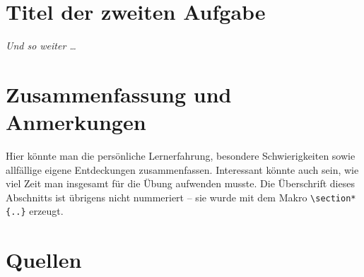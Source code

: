 \documentclass[language=german,titlepage=false,smartquotes=true]{hgbreport}
\begin{document}

\section{Titel der zweiten Aufgabe}

\emph{Und so weiter \ldots}


\section*{Zusammenfassung und Anmerkungen}

Hier könnte man die persönliche Lernerfahrung, besondere Schwierigkeiten
sowie allfällige eigene Entdeckungen zusammenfassen. Interessant könnte auch
sein, wie viel Zeit man insgesamt für die Übung aufwenden musste. Die
Überschrift dieses Abschnitts ist übrigens nicht nummeriert -- sie wurde mit
dem Makro \verb!\section*{..}! erzeugt.
 
  
\section*{Quellen}

\printbibliography[heading=noheader]

\end{document}
